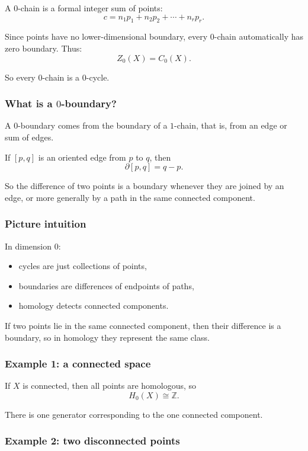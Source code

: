 \documentclass[12pt,a4paper]{article}
\newcommand{\Z}{\mathbb{Z}}
\theoremstyle{notespace}
\begin{document}
A \(0\)-chain is a formal integer sum of points:
\[
c = n_1p_1+n_2p_2+\cdots+n_rp_r.
\]

Since points have no lower-dimensional boundary, every \(0\)-chain automatically has zero boundary. Thus:
\[
Z_0(X)=C_0(X).
\]

So every \(0\)-chain is a \(0\)-cycle.

\subsubsection*{What is a \(0\)-boundary?}

A \(0\)-boundary comes from the boundary of a \(1\)-chain, that is, from an edge or sum of edges.

If \([p,q]\) is an oriented edge from \(p\) to \(q\), then
\[
\partial[p,q]=q-p.
\]

So the difference of two points is a boundary whenever they are joined by an edge, or more generally by a path in the same connected component.

\subsubsection*{Picture intuition}

In dimension \(0\):
\begin{itemize}
	\item cycles are just collections of points,
	\item boundaries are differences of endpoints of paths,
	\item homology detects connected components.
\end{itemize}

If two points lie in the same connected component, then their difference is a boundary, so in homology they represent the same class.

\subsubsection*{Example 1: a connected space}

If \(X\) is connected, then all points are homologous, so
\[
H_0(X)\cong \Z.
\]

There is one generator corresponding to the one connected component.

\subsubsection*{Example 2: two disconnected points}
\end{document}
